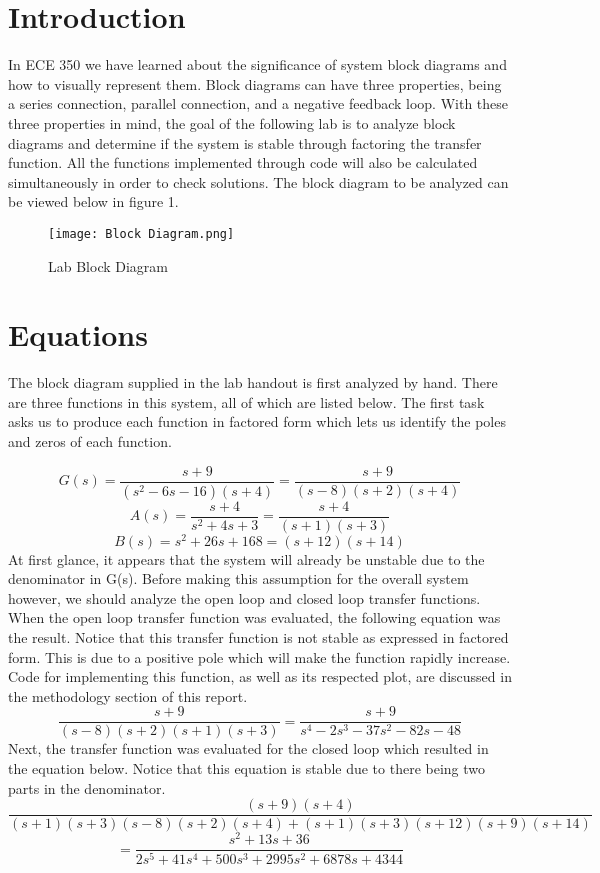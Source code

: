 \documentclass[12pt]{report}
\begin{document}
\section{Introduction}
\hspace{\parindent} In ECE 350 we have learned about the significance of system block diagrams and how to visually represent them. Block diagrams can have three properties, being a series connection, parallel connection, and a negative feedback loop. With these three properties in mind, the goal of the following lab is to analyze block diagrams and determine if the system is stable through factoring the transfer function. All the functions implemented through code will also be calculated simultaneously in order to check solutions. The block diagram to be analyzed can be viewed below in figure 1. \par
\begin{figure}[h!]
    \centering
    \texttt{[image: Block Diagram.png]}
    \caption{Lab Block Diagram}
    \label{Figure x:}
\end{figure}

\section{Equations}
\hspace{\parindent}The block diagram supplied in the lab handout is first analyzed by hand. There are three functions in this system, all of which are listed below. The first task asks us to produce each function in factored form which lets us identify the poles and zeros of each function.\par
\[G(s) = \frac{s+9}{(s^2-6s-16)(s+4)} = \frac{s+9}{(s-8)(s+2)(s+4)}\]
\[A(s) = \frac{s+4}{s^2 + 4s + 3} = \frac{s+4}{(s+1)(s+3)}\]
\[B(s) = s^2 + 26s + 168 = (s+12)(s+14)\]
\hspace{\parindent}At first glance, it appears that the system will already be unstable due to the denominator in G(s). Before making this assumption for the overall system however, we should analyze the open loop and closed loop transfer functions. When the open loop transfer function was evaluated, the following equation was the result. Notice that this transfer function is not stable as expressed in factored form. This is due to a positive pole which will make the function rapidly increase. Code for implementing this function, as well as its respected plot, are discussed in the methodology section of this report.
\[\frac{s+9}{(s-8)(s+2)(s+1)(s+3)} = \frac{s+9}{s^4-2s^3-37s^2-82s-48}\]
\hspace{\parindent}Next, the transfer function was evaluated for the closed loop which resulted in the equation below. Notice that this equation is stable due to there being two parts in the denominator.
\[\frac{(s+9)(s+4)}{(s+1)(s+3)(s-8)(s+2)(s+4) + (s+1)(s+3)(s+12)(s+9)(s+14)}\]
\[= \frac{s^2+13s+36}{2s^5+41s^4+500s^3+2995s^2+6878s+4344}\]
\end{document}
